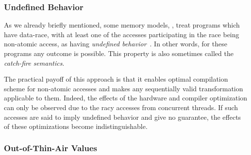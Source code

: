 \subsubsection{Undefined Behavior}
\label{sec:background:ub}

As we already briefly mentioned, some memory models, 
\eg \CPP, treat programs which have data-race, 
with at least one of the accesses participating in the race 
being non-atomic access, as having \emph{undefined behavior}~\cite{Boehm-Adve:PLDI08}.
In other words, for these programs any outcome is possible. 
This property is also sometimes called the \emph{catch-fire semantics}.
  
The practical payoff of this approach  
is that it enables optimal compilation scheme 
for non-atomic accesses and makes any sequentially valid 
transformation applicable to them.  
Indeed, the effects of the hardware and compiler 
optimization can only be observed due to the racy accesses
from concurrent threads. If such accesses are said 
to imply undefined behavior and give no guarantee, 
the effects of these optimizations become indistinguishable.

\subsubsection{Out-of-Thin-Air Values}
\label{sec:background:oota}

